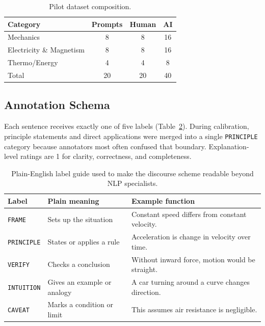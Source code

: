 \documentclass{article}
\begin{document}
\begin{table}[t]
\centering
\small
\begin{tabular}{lccc}
\toprule
Category & Prompts & Human & AI \\
\midrule
Mechanics & 8 & 8 & 16 \\
Electricity \& Magnetism & 8 & 8 & 16 \\
Thermo/Energy & 4 & 4 & 8 \\
\midrule
Total & 20 & 20 & 40 \\
\bottomrule
\end{tabular}
\caption{Pilot dataset composition.}
\label{tab:dataset}
\vspace{-0.6em}
\end{table}

\subsection{Annotation Schema}
Each sentence receives exactly one of five labels (Table~\ref{tab:labels}). During calibration, principle statements and direct applications were merged into a single \texttt{PRINCIPLE} category because annotators most often confused that boundary. Explanation-level ratings are 1 for clarity, correctness, and completeness.

\begin{table}[t]
\centering
\scriptsize
\begin{tabular}{lll}
\toprule
Label & Plain meaning & Example function \\
\midrule
\texttt{FRAME} & Sets up the situation & Constant speed differs from constant velocity. \\
\texttt{PRINCIPLE} & States or applies a rule & Acceleration is change in velocity over time. \\
\texttt{VERIFY} & Checks a conclusion & Without inward force, motion would be straight. \\
\texttt{INTUITION} & Gives an example or analogy & A car turning around a curve changes direction. \\
\texttt{CAVEAT} & Marks a condition or limit & This assumes air resistance is negligible. \\
\bottomrule
\end{tabular}
\caption{Plain-English label guide used to make the discourse scheme readable beyond NLP specialists.}
\label{tab:labels}
\vspace{-0.8em}
\end{table}
\end{document}
